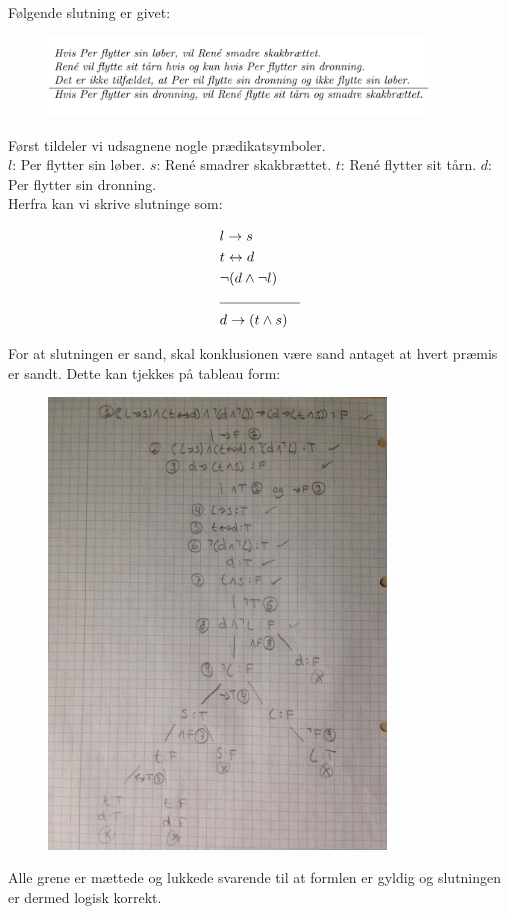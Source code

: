 Følgende slutning er givet: \\

\begin{figure}[H]
    \centering
    \includegraphics[width=0.9\textwidth]{OpgB/opgaveB.pdf}
    \label{fig:B}
\end{figure}

Først tildeler vi udsagnene nogle prædikatsymboler. \\

$l$: Per flytter sin løber. $s$: René smadrer skakbrættet. $t$: René flytter sit tårn. $d$: Per flytter sin dronning. \\

Herfra kan vi skrive slutninge som: 

\begin{align*}
    &l \rightarrow s \\
    &t \leftrightarrow d \\
    &\neg (d \wedge \neg l) \\
    &\rule{2cm}{0.4pt}\\
    &d \rightarrow (t \wedge s)
\end{align*}

For at slutningen er sand, skal konklusionen være sand antaget at hvert præmis er sandt. Dette kan tjekkes på tableau form:

\begin{figure}[H]
    \centering
    \includegraphics[width=0.8\textwidth]{OpgB/tableauB.jpg}
    \label{fig:B}
\end{figure}

Alle grene er mættede og lukkede svarende til at formlen er gyldig og slutningen er dermed logisk korrekt.